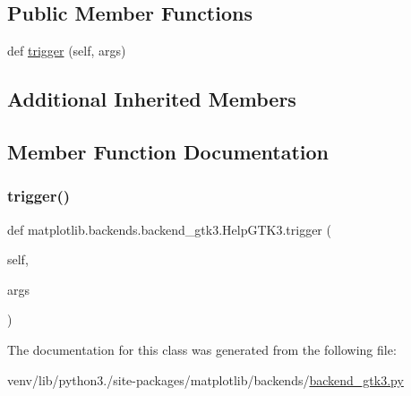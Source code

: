\subsection*{Public Member Functions}
\begin{DoxyCompactItemize}
\item 
def \hyperlink{classmatplotlib_1_1backends_1_1backend__gtk3_1_1HelpGTK3_ac5090484fb209fa32f0a84310077c954}{trigger} (self, args)
\end{DoxyCompactItemize}
\subsection*{Additional Inherited Members}


\subsection{Member Function Documentation}
\mbox{\label{classmatplotlib_1_1backends_1_1backend__gtk3_1_1HelpGTK3_ac5090484fb209fa32f0a84310077c954}} 
\subsubsection{\texorpdfstring{trigger()}{trigger()}}
{\footnotesize\ttfamily def matplotlib.\+backends.\+backend\+\_\+gtk3.\+Help\+G\+T\+K3.\+trigger (\begin{DoxyParamCaption}\item[{}]{self,  }\item[{}]{args }\end{DoxyParamCaption})}



The documentation for this class was generated from the following file\+:\begin{DoxyCompactItemize}
\item 
venv/lib/python3./site-\/packages/matplotlib/backends/\hyperlink{backend__gtk3_8py}{backend\+\_\+gtk3.\+py}\end{DoxyCompactItemize}
